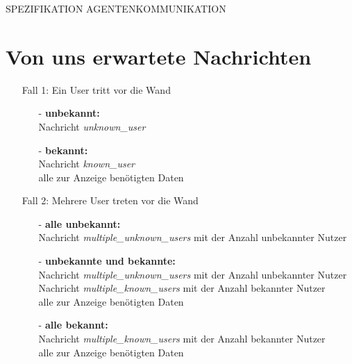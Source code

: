 \documentclass[10pt,a4paper]{article}
\begin{document}
\begin{center}
\Huge{SPEZIFIKATION AGENTENKOMMUNIKATION}
\end{center}
\section{Von uns erwartete Nachrichten}
\begin{itemize}
\item[] Fall 1: Ein User tritt vor die Wand
	\begin{itemize}
	\item[-] \textbf{unbekannt:}\\
		Nachricht \textit{unknown\_user}
	\item[-] \textbf{bekannt:}\\
		Nachricht \textit{known\_user}\\
		 alle zur Anzeige benötigten Daten
	\end{itemize}
\item[] Fall 2: Mehrere User treten vor die Wand
	\begin{itemize}
		\item[-] \textbf{alle unbekannt:}\\
			Nachricht \textit{multiple\_unknown\_users} mit der Anzahl unbekannter Nutzer
		\item[-] \textbf{unbekannte und bekannte:}\\
			Nachricht \textit{multiple\_unknown\_users} mit der Anzahl unbekannter Nutzer\\
			Nachricht \textit{multiple\_known\_users} mit der Anzahl bekannter Nutzer\\
			 alle zur Anzeige benötigten Daten
		\item[-] \textbf{alle bekannt:}\\
			Nachricht \textit{multiple\_known\_users} mit der Anzahl bekannter Nutzer\\
			alle zur Anzeige benötigten Daten
	\end{itemize}
\end{itemize}
\end{document}
